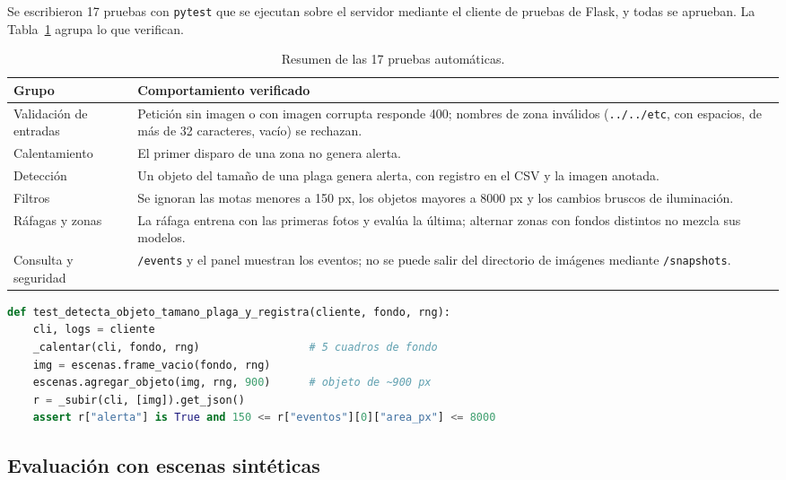 \documentclass[11pt,a4paper]{article}
\begin{document}
Se escribieron 17 pruebas con \texttt{pytest} que se ejecutan sobre el servidor mediante el cliente de pruebas de Flask, y todas se aprueban. La Tabla~\ref{tab:pruebas} agrupa lo que verifican.

\begin{table}[H]
\centering
\small
\begin{tabular}{>{\raggedright\arraybackslash}p{4.2cm}>{\raggedright\arraybackslash}p{9.6cm}}
\toprule
\textbf{Grupo} & \textbf{Comportamiento verificado} \\
\midrule
Validación de entradas & Petición sin imagen o con imagen corrupta responde 400; nombres de zona inválidos (\texttt{../../etc}, con espacios, de más de 32 caracteres, vacío) se rechazan. \\
Calentamiento & El primer disparo de una zona no genera alerta. \\
Detección & Un objeto del tamaño de una plaga genera alerta, con registro en el CSV y la imagen anotada. \\
Filtros & Se ignoran las motas menores a 150 px, los objetos mayores a 8000 px y los cambios bruscos de iluminación. \\
Ráfagas y zonas & La ráfaga entrena con las primeras fotos y evalúa la última; alternar zonas con fondos distintos no mezcla sus modelos. \\
Consulta y seguridad & \texttt{/events} y el panel muestran los eventos; no se puede salir del directorio de imágenes mediante \texttt{/snapshots}. \\
\bottomrule
\end{tabular}
\caption{Resumen de las 17 pruebas automáticas.}
\label{tab:pruebas}
\end{table}

\begin{lstlisting}[language=Python,caption={Ejemplo de prueba: un objeto de tamaño de plaga debe generar alerta (fragmento de \texttt{test\_servidor.py}).},label={lst:test}]
def test_detecta_objeto_tamano_plaga_y_registra(cliente, fondo, rng):
    cli, logs = cliente
    _calentar(cli, fondo, rng)                 # 5 cuadros de fondo
    img = escenas.frame_vacio(fondo, rng)
    escenas.agregar_objeto(img, rng, 900)      # objeto de ~900 px
    r = _subir(cli, [img]).get_json()
    assert r["alerta"] is True and 150 <= r["eventos"][0]["area_px"] <= 8000
\end{lstlisting}

\subsection{Evaluación con escenas sintéticas}
\label{sec:eval}
\end{document}
